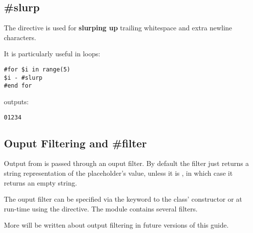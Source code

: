 \subsection{\#slurp}
\label{directives.slurp}

The  directive is used for {\bf slurping up} trailing whitespace
and extra newline characters.


It is particularly useful in  loops:
\begin{verbatim}
#for $i in range(5)
$i - #slurp
#end for
\end{verbatim}
outputs:
\begin{verbatim}
01234
\end{verbatim}


\subsection{Ouput Filtering and \#filter}
\label{directives.filter}

Output from  is passed through an ouput filter.  By default
the filter just returns a string representation of the placeholder's value,
unless it is , in which case it returns an empty string. 

The ouput filter can be specified via the  keyword to the
 class' constructor or at run-time using the 
directive. The  module contains several filters.

More will be written about output filtering in future versions of this guide.



